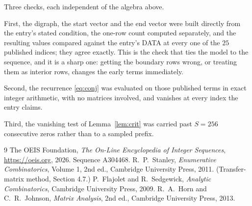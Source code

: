 \documentclass[11pt,a4paper]{article}
\theoremstyle{plain}
\theoremstyle{definition}
\begin{document}
Three checks, each independent of the algebra above.

First, the digraph, the start vector and the end vector were built directly from the
entry's stated condition, the one-row count computed separately, and the resulting values
compared against the entry's DATA at every one of the $25$ published indices; they
agree exactly. This is the check that ties the model to the sequence, and it is a sharp one:
getting the boundary rows wrong, or treating them as interior rows, changes the early terms
immediately.

Second, the recurrence \eqref{eq:conj} was evaluated on those published terms in exact
integer arithmetic, with no matrices involved, and vanishes at every index the entry claims.

Third, the vanishing test of Lemma~\ref{lem:crit} was carried past $S=256$ consecutive
zeros rather than to a sampled prefix.

\begin{thebibliography}{9}
 The OEIS Foundation, \emph{The On-Line Encyclopedia of Integer
Sequences}, \url{https://oeis.org}, 2026. Sequence A304468.
 R.~P.~Stanley, \emph{Enumerative Combinatorics}, Volume 1, 2nd ed.,
Cambridge University Press, 2011. (Transfer-matrix method, Section 4.7.)
 P.~Flajolet and R.~Sedgewick, \emph{Analytic Combinatorics}, Cambridge
University Press, 2009.
 R.~A.~Horn and C.~R.~Johnson, \emph{Matrix Analysis}, 2nd ed., Cambridge
University Press, 2013.
\end{thebibliography}
\end{document}
